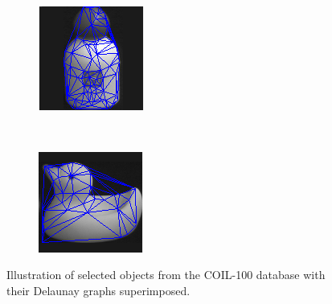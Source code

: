 \documentclass[10pt,a4paper]{article}
\begin{document}
\begin{figure}[H]
\begin{subfigure}[b]{0.15\textwidth}
    	\caption{}
    	\label{}
    \end{subfigure}~
    \begin{subfigure}[b]{0.15\textwidth}
    	\includegraphics[width= \textwidth]{images/BottleSuperimpose.png}
    	\caption{}
    	\label{}
    \end{subfigure}~
    \begin{subfigure}[b]{0.15\textwidth}
    	\includegraphics[width= \textwidth]{images/BirdSuperimpose.png}
    	\caption{}
    	\label{}
    \end{subfigure}
	\caption{Illustration of selected objects from the COIL-100 database with their Delaunay graphs superimposed.}
	\label{}
\end{figure}
\end{document}
